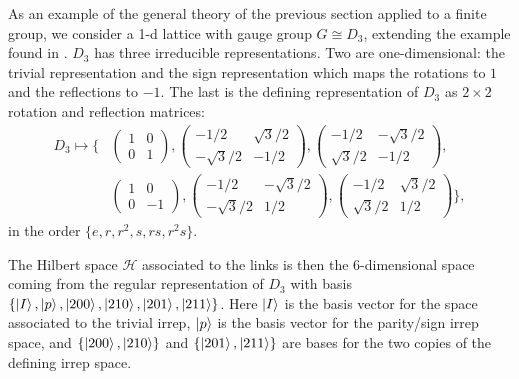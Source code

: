 \documentclass[10pt,reqno]{amsart}
\numberwithin{equation}{section}
\begin{document}
	As an example of the general theory of the previous section applied to a finite group, we consider a 1-d lattice with gauge group $G\cong D_3$, extending the example found in \cite[Appendix 1]{ZoharBurrello15}.
	$D_3$ has three irreducible representations.
	Two are one-dimensional: the trivial representation and the sign representation which maps the rotations to $1$ and the reflections to $-1$.
	The last is the defining representation of $D_3$ as $2\times 2$ rotation and reflection matrices:
	\begin{align*}
		D_3 \mapsto \bigg\{ &\begin{pmatrix}
		1 & 0\\ 0 & 1
		\end{pmatrix},
		\begin{pmatrix}
		-1/2 & \sqrt{3}/2\\ -\sqrt{3}/2 & -1/2
		\end{pmatrix},
		\begin{pmatrix}
		-1/2 & -\sqrt{3}/2\\ \sqrt{3}/2 & -1/2
		\end{pmatrix}, \\	
		&\begin{pmatrix}
		1 & 0\\ 0 & -1
		\end{pmatrix},
		\begin{pmatrix}
		-1/2 & -\sqrt{3}/2\\ -\sqrt{3}/2 & 1/2
		\end{pmatrix},
		\begin{pmatrix}
		-1/2 & \sqrt{3}/2\\ \sqrt{3}/2 & 1/2
		\end{pmatrix} \bigg\}, 
	\end{align*}
	in the order $\{e, r, r^2, s, rs, r^2s\}$.
		
	The Hilbert space $\mathcal{H}$ associated to the links is then the 6-dimensional space coming from the regular representation of $D_3$ with basis $\{ \ket{I},\ket{p},\ket{200},\ket{210},\ket{201},\ket{211} \}$.
	Here $\ket{I}$ is the basis vector for the space associated to the trivial irrep, $\ket{p}$ is the basis vector for the parity/sign irrep space, and $\{\ket{200},\ket{210}\}$ and $\{\ket{201},\ket{211}\}$ are bases for the two copies of the defining irrep space.
	
\end{document}
